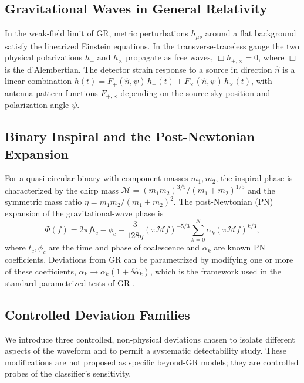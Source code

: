 \subsection{Gravitational Waves in General Relativity}

In the weak-field limit of GR, metric perturbations $h_{\mu\nu}$ around
a flat background satisfy the linearized Einstein equations. In the
transverse-traceless gauge the two physical polarizations $h_+$ and
$h_\times$ propagate as free waves, $\Box h_{+,\times} = 0$, where
$\Box$ is the d'Alembertian. The detector strain response to a source
in direction $\hat{n}$ is a linear combination
$h(t) = F_+(\hat{n}, \psi)\, h_+(t) + F_\times(\hat{n}, \psi)\, h_\times(t)$,
with antenna pattern functions $F_{+,\times}$ depending on the source
sky position and polarization angle $\psi$.

\subsection{Binary Inspiral and the Post-Newtonian Expansion}

For a quasi-circular binary with component masses $m_1, m_2$, the
inspiral phase is characterized by the chirp mass
$\mathcal{M} = (m_1 m_2)^{3/5} / (m_1 + m_2)^{1/5}$ and the symmetric
mass ratio $\eta = m_1 m_2 / (m_1 + m_2)^2$. The post-Newtonian (PN)
expansion of the gravitational-wave phase is
\begin{equation}
    \Phi(f) = 2\pi f t_c - \phi_c
    + \frac{3}{128 \eta} \left( \pi \mathcal{M} f \right)^{-5/3}
    \sum_{k=0}^{N} \alpha_k \left( \pi \mathcal{M} f \right)^{k/3},
\end{equation}
where $t_c, \phi_c$ are the time and phase of coalescence and
$\alpha_k$ are known PN coefficients. Deviations from GR can be
parametrized by modifying one or more of these coefficients,
$\alpha_k \rightarrow \alpha_k (1 + \delta \hat{\alpha}_k)$, which is
the framework used in the standard parametrized tests of GR
\citep{Yunes2019}.

\subsection{Controlled Deviation Families}

We introduce three controlled, non-physical deviations chosen to
isolate different aspects of the waveform and to permit a systematic
detectability study. These modifications are not proposed as specific
beyond-GR models; they are controlled probes of the classifier's
sensitivity.

